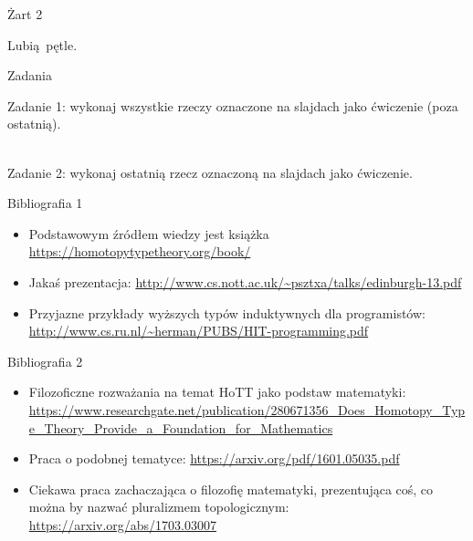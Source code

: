 \documentclass{beamer}
\begin{document}
\begin{frame}{Żart 2}

Lubią pętle.

\end{frame}

\begin{frame}{Zadania}

Zadanie 1: wykonaj wszystkie rzeczy oznaczone na slajdach jako ćwiczenie (poza ostatnią). \\~\

Zadanie 2: wykonaj ostatnią rzecz oznaczoną na slajdach jako ćwiczenie.

\end{frame}

\begin{frame}{Bibliografia 1}
\begin{itemize}
	\item Podstawowym źródłem wiedzy jest książka \url{https://homotopytypetheory.org/book/}
	\item Jakaś prezentacja: \url{http://www.cs.nott.ac.uk/~psztxa/talks/edinburgh-13.pdf}
	\item Przyjazne przykłady wyższych typów induktywnych dla programistów: \url{http://www.cs.ru.nl/~herman/PUBS/HIT-programming.pdf}
\end{itemize}
\end{frame}

\begin{frame}{Bibliografia 2}
\begin{itemize}
	\item Filozoficzne rozważania na temat HoTT jako podstaw matematyki: \url{https://www.researchgate.net/publication/280671356_Does_Homotopy_Type_Theory_Provide_a_Foundation_for_Mathematics}
	\item Praca o podobnej tematyce: \url{https://arxiv.org/pdf/1601.05035.pdf}
	\item Ciekawa praca zachaczająca o filozofię matematyki, prezentująca coś, co można by nazwać pluralizmem topologicznym: \url{https://arxiv.org/abs/1703.03007}
\end{itemize}
\end{frame}
\end{document}
